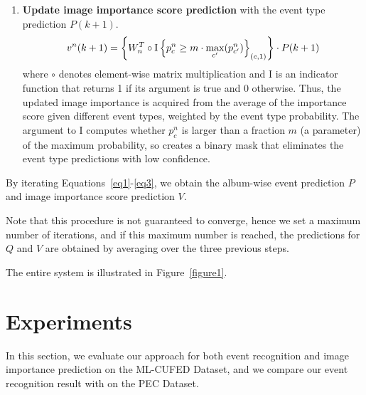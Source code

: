 \documentclass[runningheads]{llncs}
\begin{document}
\begin{enumerate}
%
\vspace{0.05in}
  \item \textbf{Update image importance score prediction} with the event type prediction $P(k+1)$.
  \begin{equation}
v^{n}(k+1) = \left \{W_{n}^{T} \circ \textup{I}\left \{ p^{n}_{c}\geq m\cdot \max_{c'}(p^{n}_{c'}) \right \}_{(c,1)}\right \} \cdot  P(k+1)
  \label{eq3}
\end{equation}
 where $\circ$ denotes element-wise matrix multiplication and \textup{I} is an indicator function that returns 1 if its argument is true and 0 otherwise. Thus, the updated image importance is acquired from the average of the importance score given different event types, weighted by the event type probability. The argument to \textup{I} computes whether $p^{n}_{c}$ is larger than a fraction $m$ (a parameter) of the maximum probability, so creates a binary mask that eliminates the event type predictions with low confidence. 
%
%
%
%
%
\end{enumerate}

By iterating Equations~\ref{eq1}-\ref{eq3}, we obtain the album-wise event prediction $P$ and image importance score prediction $V$. 

Note that this procedure is not guaranteed to converge, hence we set a maximum number of iterations, and if this maximum number is reached, the predictions for $Q$ and $V$ are obtained by averaging over the three previous steps.

The entire system is illustrated in Figure~\ref{figure1}.

\section{Experiments}
In this section, we evaluate our approach for both event recognition and image importance prediction on the ML-CUFED Dataset, and we compare our event recognition result with \cite{HMM} on the PEC Dataset.
\end{document}
